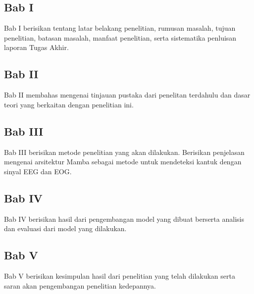 \subsection*{Bab I}
Bab I berisikan tentang latar belakang penelitian, rumusan masalah, tujuan penelitian, batasan masalah, manfaat penelitian, serta sistematika penluisan laporan Tugas Akhir. \par

\subsection*{Bab II}
Bab II membahas mengenai tinjauan pustaka dari penelitan terdahulu dan dasar teori yang berkaitan dengan penelitian ini.

\subsection*{Bab III}
Bab III berisikan metode penelitian yang akan dilakukan. Berisikan penjelasan mengenai arsitektur Mamba sebagai metode untuk mendeteksi kantuk dengan sinyal EEG dan EOG.

\subsection*{Bab IV}
Bab IV berisikan hasil dari pengembangan model yang dibuat berserta analisis dan evaluasi dari model yang dilakukan.

\subsection*{Bab V}
Bab V berisikan kesimpulan hasil dari penelitian yang telah dilakukan serta saran akan pengembangan penelitian kedepannya.